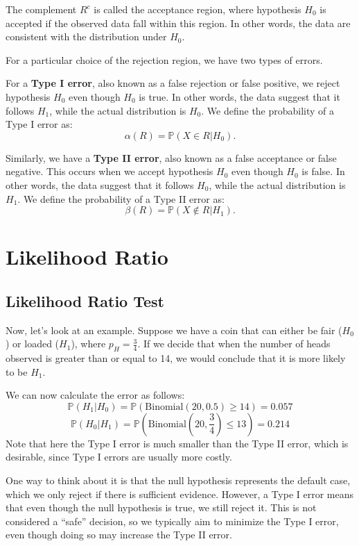 The complement \(R^{c}\) is called the acceptance region, where hypothesis \(H_0\) is accepted if the observed data fall within this region. In other words, the data are consistent with the distribution under \(H_0\).

For a particular choice of the rejection region, we have two types of errors.

For a \textbf{Type I error}, also known as a false rejection or false positive, we reject hypothesis \(H_0\) even though \(H_0\) is true. In other words, the data suggest that it follows \(H_1\), while the actual distribution is \(H_0\). We define the probability of a Type I error as:  
\[
  \alpha (R) = \mathbb{P}(X \in R \vert H_0).
\]

Similarly, we have a \textbf{Type II error}, also known as a false acceptance or false negative. This occurs when we accept hypothesis \(H_0\) even though \(H_0\) is false. In other words, the data suggest that it follows \(H_0\), while the actual distribution is \(H_1\). We define the probability of a Type II error as:  
\[
  \beta (R) = \mathbb{P}(X \notin R \vert H_1).
\]

\section{Likelihood Ratio}
\subsection{Likelihood Ratio Test}
Now, let's look at an example. Suppose we have a coin that can either be fair (\(H_0\)) or loaded (\(H_1\)), where \(p_H = \frac{3}{4}\). If we decide that when the number of heads observed is greater than or equal to 14, we would conclude that it is more likely to be \(H_1\).  

We can now calculate the error as follows:  
\[
  \mathbb{P}(H_1 \vert H_0) = \mathbb{P}(\text{Binomial}(20, 0.5) \geq 14) = 0.057
\]  
\[
  \mathbb{P}(H_0 \vert H_1) = \mathbb{P}(\text{Binomial}(20, \frac{3}{4}) \leq 13) = 0.214
\]
Note that here the Type I error is much smaller than the Type II error, which is desirable, since Type I errors are usually more costly.  

One way to think about it is that the null hypothesis represents the default case, which we only reject if there is sufficient evidence. However, a Type I error means that even though the null hypothesis is true, we still reject it. This is not considered a ``safe'' decision, so we typically aim to minimize the Type I error, even though doing so may increase the Type II error.  

